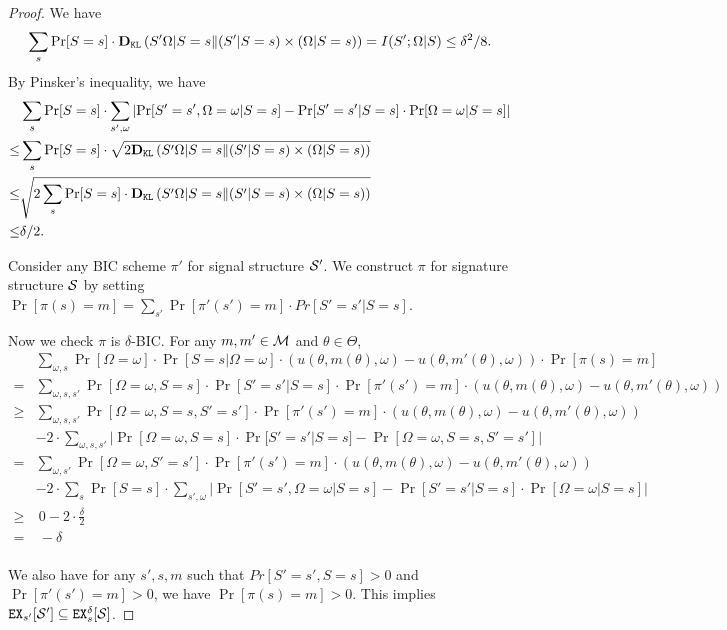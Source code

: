 \begin{proof}
We have 
\[
\sum_{s} \Pr[S=s] \cdot \DKL\left(S'\Omega|S=s \| (S'|S=s) \times (\Omega|S=s) \right) = I(S' ; \Omega|S) \leq \delta^2/8. 
\]
By Pinsker's inequality, we have
\begin{align*}
       &\sum_{s} \Pr[S = s] \cdot  \sum_{s', \omega} \left| \Pr[S' = s', \Omega = \omega| S= s] - \Pr[S'=s'|S=s] \cdot \Pr[\Omega = \omega|S=s]\right| \\
\leq & \sum_{s} \Pr[S=s] \cdot \sqrt{2 \DKL\left(S'\Omega|S=s \| (S'|S=s) \times (\Omega|S=s) \right)  } \\
\leq &  \sqrt{2 \sum_{s} \Pr[S=s] \cdot  \DKL\left(S'\Omega|S=s \| (S'|S=s) \times (\Omega|S=s) \right) } \\
\leq &\delta /2. \\
\end{align*}

Consider any BIC scheme $\pi'$ for signal structure $\S'$. We construct $\pi$ for signature structure $\S$ by setting $\Pr[\pi(s) = m] = \sum_{s'} \Pr[\pi'(s') = m] \cdot Pr[S' = s'|S = s]$. 

Now we check $\pi$ is $\delta$-BIC. For any $m,m' \in \M$ and $\theta \in \varTheta$,
\begin{align*}
& \sum_{\omega,s} \Pr[\Omega= \omega] \cdot \Pr[S = s | \Omega = \omega] \cdot \left(u(\theta, m(\theta), \omega) - u(\theta, m'(\theta), \omega)\right) \cdot  \Pr[\pi(s) = m] \\
=&\sum_{\omega,s,s'} \Pr[\Omega = \omega, S = s] \cdot \Pr[ S'=s'|S= s] \cdot \Pr[\pi'(s') = m]   \cdot \left(u(\theta, m(\theta), \omega) - u(\theta, m'(\theta), \omega)\right)\\
\geq &\sum_{\omega,s,s'} \Pr[\Omega = \omega, S = s, S'=s'] \cdot \Pr[\pi'(s') = m]   \cdot \left(u(\theta, m(\theta), \omega) - u(\theta, m'(\theta),
 \omega)\right)\\
& -2 \cdot \sum_{\omega,s,s'} | \Pr[\Omega = \omega, S = s] \cdot \Pr[ S'=s'|S= s] -  \Pr[\Omega = \omega, S = s, S'=s']| \\
= &\sum_{\omega,s'} \Pr[\Omega = \omega, S'=s'] \cdot \Pr[\pi'(s') = m]   \cdot \left(u(\theta, m(\theta), \omega) - u(\theta, m'(\theta),
 \omega)\right)\\
& -2 \cdot \sum_{s} \Pr[S = s] \cdot  \sum_{s', \omega} \left| \Pr[S' = s', \Omega = \omega| S= s] - \Pr[S'=s'|S=s] \cdot \Pr[\Omega = \omega|S=s]\right| \\
\geq&  ~0- 2 \cdot \frac{\delta}{2}\\
 =& ~-\delta\\
\end{align*}

We also have for any $s', s ,m$ such that $Pr[S' = s',S = s] >0 $ and $\Pr[\pi'(s') = m] >0$, we have $\Pr[\pi(s) = m] > 0$. This implies $\EX_{s'}[\S'] \subseteq \EX^{\delta}_s[\S]$. 
\end{proof}


